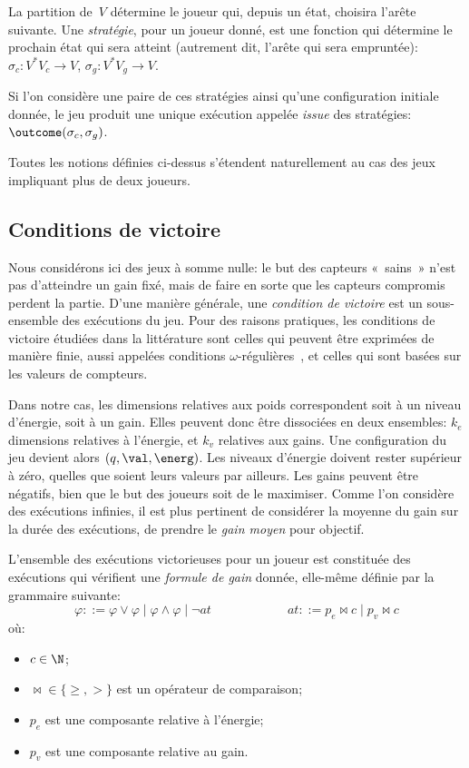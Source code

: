 La partition de~$V$ détermine le joueur qui, depuis un état, choisira l'arête suivante.
Une \emph{stratégie}, pour un joueur donné, est une fonction qui détermine le prochain état qui sera atteint (autrement dit, l'arête qui sera empruntée): $\sigma_c: V^* V_c \rightarrow V$, $\sigma_g: V^* V_g \rightarrow V$.

Si l'on considère une paire de ces stratégies ainsi qu'une configuration initiale donnée, le jeu produit une unique exécution appelée \emph{issue} des stratégies: $\outcome(\sigma_c,\sigma_g)$.

\begin{remark}
Toutes les notions définies ci-dessus s'étendent naturellement au cas des jeux impliquant plus de deux joueurs.
\end{remark}

\subsection{Conditions de victoire}

Nous considérons ici des jeux à somme nulle: le but des capteurs « sains » n'est pas d'atteindre un gain fixé, mais de faire en sorte que les capteurs compromis perdent la partie.
D'une manière générale, une \emph{condition de victoire} est un sous-ensemble des exécutions du jeu.
Pour des raisons pratiques, les conditions de victoire étudiées dans la littérature sont celles qui peuvent être exprimées de manière finie, aussi appelées conditions $\omega$-régulières~\cite{GTW02}, et celles qui sont basées sur les valeurs de compteurs.

Dans notre cas, les dimensions relatives aux poids correspondent soit à un niveau d'énergie, soit à un gain.
Elles peuvent donc être dissociées en deux ensembles: $k_e$ dimensions relatives à l'énergie, et $k_v$ relatives aux gains.
Une configuration du jeu devient alors $(q,\val,\energ)$.
Les niveaux d'énergie doivent rester supérieur à zéro, quelles que soient leurs valeurs par ailleurs.
Les gains peuvent être négatifs, bien que le but des joueurs soit de le maximiser.
Comme l'on considère des exécutions infinies, il est plus pertinent de considérer la moyenne du gain sur la durée des exécutions, \cad de prendre le \emph{gain moyen} pour objectif.

L'ensemble des exécutions victorieuses pour un joueur est constituée des exécutions qui vérifient une \emph{formule de gain} donnée, elle-même définie par la grammaire suivante:
\[ \varphi ::= \varphi \vee \varphi \mid \varphi \wedge \varphi \mid \neg\mathit{at}
\hspace{6em}
\mathit{at} ::= p_e \bowtie c \mid p_v \bowtie c \]
où:
\begin{itemize}
    \item $c \in \N$;
    \item $\bowtie \in \{\geq,>\}$ est un opérateur de comparaison;
    \item $p_e$ est une composante relative à l'énergie;
    \item $p_v$ est une composante relative au gain.
\end{itemize}

